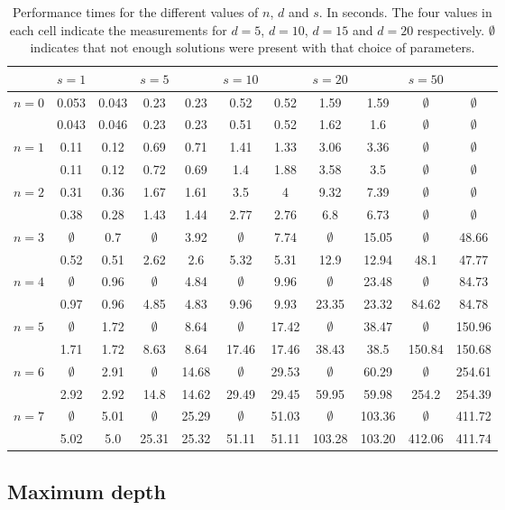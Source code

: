 \documentclass[12pt,a4paper]{article}
\begin{document}
\begin{table}[ht]
\label{all_results}
\caption{Performance times for the different values of $n$, $d$ and $s$. In seconds. The four values in each cell indicate the measurements for $d = 5$, $d = 10$, $d = 15$ and $d = 20$ respectively. $\emptyset$ indicates that not enough solutions were present with that choice of parameters.}
\centering
\begin{tabular}{c | c c | c c | c c | c c | c c |}
&$s=1$&&$s=5$&&$s=10$&&$s=20$&&$s=50$&\\
\hline
$n=0$&0.053&0.043&0.23&0.23&0.52&0.52&1.59&1.59&$\emptyset$&$\emptyset$\\
&0.043&0.046&0.23&0.23&0.51&0.52&1.62&1.6&$\emptyset$&$\emptyset$\\
\hline
$n=1$&0.11&0.12&0.69&0.71&1.41&1.33&3.06&3.36&$\emptyset$&$\emptyset$\\
&0.11&0.12&0.72&0.69&1.4&1.88&3.58&3.5&$\emptyset$&$\emptyset$\\
\hline
$n=2$&0.31&0.36&1.67&1.61&3.5&4&9.32&7.39&$\emptyset$&$\emptyset$\\
&0.38&0.28&1.43&1.44&2.77&2.76&6.8&6.73&$\emptyset$&$\emptyset$\\
\hline
$n=3$&$\emptyset$&0.7&$\emptyset$&3.92&$\emptyset$&7.74&$\emptyset$&15.05&$\emptyset$&48.66\\
&0.52&0.51&2.62&2.6&5.32&5.31&12.9&12.94&48.1&47.77\\
\hline
$n=4$&$\emptyset$&0.96&$\emptyset$&4.84&$\emptyset$&9.96&$\emptyset$&23.48&$\emptyset$&84.73\\
&0.97&0.96&4.85&4.83&9.96&9.93&23.35&23.32&84.62&84.78\\
\hline
$n=5$&$\emptyset$&1.72&$\emptyset$&8.64&$\emptyset$&17.42&$\emptyset$&38.47&$\emptyset$&150.96\\
&1.71&1.72&8.63&8.64&17.46&17.46&38.43&38.5&150.84&150.68\\
\hline
$n=6$&$\emptyset$&2.91&$\emptyset$&14.68&$\emptyset$&29.53&$\emptyset$&60.29&$\emptyset$&254.61\\
&2.92&2.92&14.8&14.62&29.49&29.45&59.95&59.98&254.2&254.39\\
\hline
$n=7$&$\emptyset$&5.01&$\emptyset$&25.29&$\emptyset$&51.03&$\emptyset$&103.36&$\emptyset$&411.72\\
&5.02&5.0&25.31&25.32&51.11&51.11&103.28&103.20&412.06&411.74\\
\hline
\end{tabular}
\end{table}

\subsection{Maximum depth}
\end{document}
